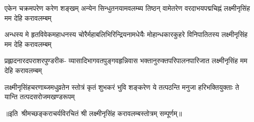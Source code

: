 \fourlineindentedshloka
{एकेन चक्रमपरेण करेण शङ्खम्}
{अन्येन सिन्धुतनयामवलम्ब्य तिष्ठन्}
{वामेतरेण वरदाभयपद्मचिह्नं}
{लक्ष्मीनृसिंह मम देहि करावलम्बम्} 

\fourlineindentedshloka
{अन्धस्य मे हृतविवेकमहाधनस्य}
{चोरैर्महाबलिभिरिन्द्रियनामधेयैः}
{मोहान्धकारकुहरे विनिपातितस्य}
{लक्ष्मीनृसिंह मम देहि करावलम्बम्} 

\fourlineindentedshloka
{प्रह्लादनारदपराशरपुण्डरीक-}
{व्यासादिभागवतपुङ्गवहृन्निवास}
{भक्तानुरुक्तपरिपालनपारिजात}
{लक्ष्मीनृसिंह मम देहि करावलम्बम्} 

\fourlineindentedshloka
{लक्ष्मीनृसिंहचरणाब्जमधुव्रतेन}
{स्तोत्रं कृतं शुभकरं भुवि शङ्करेण}
{ये तत्पठन्ति मनुजा हरिभक्तियुक्ताः}
{ते यान्ति तत्पदसरोजमखण्डरूपम्} 
       
॥इति~श्रीमच्छङ्कराचर्यविरचितं श्री लक्ष्मीनृसिंह करावलम्बस्तोत्रम् सम्पूर्णम्‌॥ 